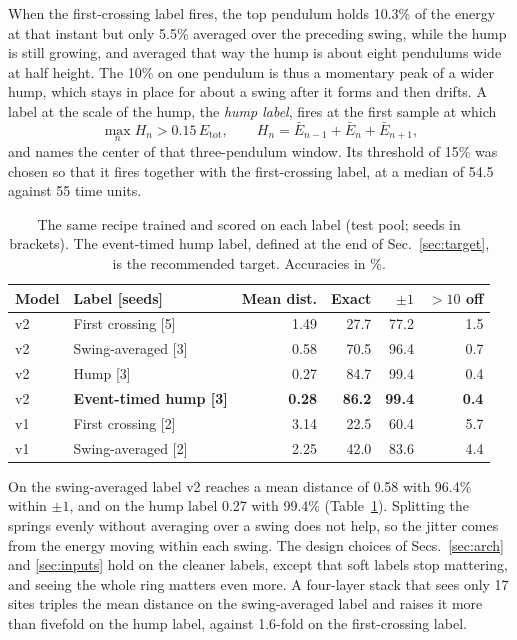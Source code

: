 \documentclass[11pt]{article}
\newcommand{\Etot}{E_{\mathrm{tot}}}
\begin{document}
When the first-crossing label fires, the top pendulum holds 10.3\% of the energy at that instant but only 5.5\% averaged over the preceding swing, while the hump is still growing, and averaged that way the hump is about eight pendulums wide at half height. The 10\% on one pendulum is thus a momentary peak of a wider hump, which stays in place for about a swing after it forms and then drifts. A label at the scale of the hump, the \emph{hump label}, fires at the first sample at which
\begin{equation}
\label{eq:hump}
\max_n H_n > 0.15\,\Etot , \qquad H_n = \bar E_{n-1} + \bar E_n + \bar E_{n+1} ,
\end{equation}
and names the center of that three-pendulum window. Its threshold of 15\% was chosen so that it fires together with the first-crossing label, at a median of 54.5 against 55 time units.

\begin{table}[t]
  \centering
  \caption{The same recipe trained and scored on each label (test pool; seeds in brackets). The event-timed hump label, defined at the end of Sec.~\ref{sec:target}, is the recommended target. Accuracies in \%.}
  \label{tab:labels}
  \small
  \begin{tabular}{@{}llrrrr@{}}
    \toprule
    Model & Label [seeds] & Mean dist. & Exact & $\pm1$ & $>10$ off \\
    \midrule
    v2 & First crossing [5] & 1.49 & 27.7 & 77.2 & 1.5 \\
    v2 & Swing-averaged [3] & 0.58 & 70.5 & 96.4 & 0.7 \\
    v2 & Hump [3] & 0.27 & 84.7 & 99.4 & 0.4 \\
    v2 & \textbf{Event-timed hump [3]} & \textbf{0.28} & \textbf{86.2} & \textbf{99.4} & \textbf{0.4} \\
    \midrule
    v1 & First crossing [2] & 3.14 & 22.5 & 60.4 & 5.7 \\
    v1 & Swing-averaged [2] & 2.25 & 42.0 & 83.6 & 4.4 \\
    \bottomrule
  \end{tabular}
\end{table}

On the swing-averaged label v2 reaches a mean distance of 0.58 with 96.4\% within $\pm1$, and on the hump label 0.27 with 99.4\% (Table~\ref{tab:labels}). Splitting the springs evenly without averaging over a swing does not help, so the jitter comes from the energy moving within each swing. The design choices of Secs.~\ref{sec:arch} and \ref{sec:inputs} hold on the cleaner labels, except that soft labels stop mattering, and seeing the whole ring matters even more. A four-layer stack that sees only 17 sites triples the mean distance on the swing-averaged label and raises it more than fivefold on the hump label, against 1.6-fold on the first-crossing label.
\end{document}
